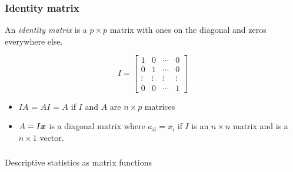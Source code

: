\documentclass{beamer}
\begin{document}


\begin{frame}
  \frametitle{Identity matrix}

An \emph{identity matrix} is a $p \times p$ matrix with ones on the diagonal and zeros everywhere else.

\[
I = \left[ \begin{array}{cccc}

1 & 0 & \cdots & 0 \\
0 & 1 & \cdots & 0 \\
\vdots & \vdots & \vdots & \vdots \\
0 & 0 & \cdots & 1
\end{array}
\right]
\]

\begin{itemize}
 \item $IA$ = $AI$ = $A$ if $I$ and $A$ are  $n \times p$ matrices
 \item $A = I\bm{x}$ is a diagonal matrix where $a_{ii} = x_i$ if $I$ is an $n \times n$ matrix and  is a $n \times 1$ vector.

\end{itemize}


\end{frame}


\begin{frame}
  \frametitle{}
\begin{center}
\begin{Huge}
{\rmfamily Descriptive statistics as matrix functions}
\end{Huge}
\end{center}
\end{frame}

\end{document}
